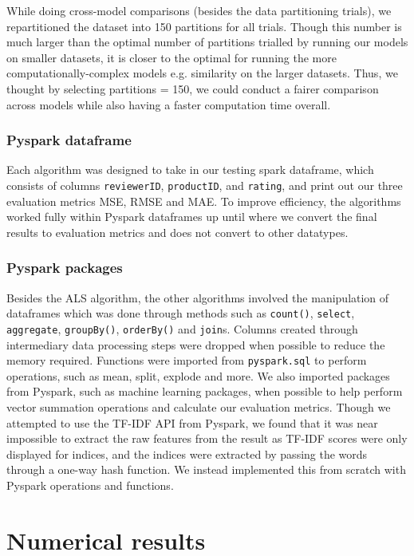 \documentclass[sigconf,authorversion,nonacm]{acmart}
\begin{document}
    While doing cross-model comparisons (besides the data partitioning trials), we repartitioned the dataset into 150 partitions for all trials. Though this number is much larger than the optimal number of partitions trialled by running our models on smaller datasets, it is closer to the optimal for running the more computationally-complex models e.g. similarity on the larger datasets. Thus, we thought by selecting partitions = 150, we could conduct a fairer comparison across models while also having a faster computation time overall. 

    \subsubsection{Pyspark dataframe}
    
    Each algorithm was designed to take in our testing spark dataframe, which consists of columns \verb|reviewerID|, \verb|productID|, and \verb|rating|, and print out our three evaluation metrics MSE, RMSE and MAE. To improve efficiency, the algorithms worked fully within Pyspark dataframes up until where we convert the final results to evaluation metrics and does not convert to other datatypes.

    \subsubsection{Pyspark packages}
    
    Besides the ALS algorithm, the other algorithms involved the manipulation of dataframes which was done through methods such as \verb|count()|, \verb|select|, \verb|aggregate|, \verb|groupBy()|, \verb|orderBy()| and \verb|join|s. Columns created through intermediary data processing steps were dropped when possible to reduce the memory required. Functions were imported from \verb|pyspark.sql| to perform operations, such as mean, split, explode and more. We also imported packages from Pyspark, such as machine learning packages, when possible to help perform vector summation operations and calculate our evaluation metrics. Though we attempted to use the TF-IDF API from Pyspark, we found that it was near impossible to extract the raw features from the result as TF-IDF scores were only displayed for indices, and the indices were extracted by passing the words through a one-way hash function. We instead implemented this from scratch with Pyspark operations and functions. 


\section{Numerical results}
\end{document}
